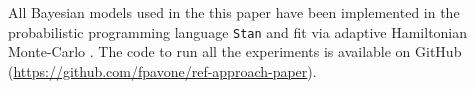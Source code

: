 \documentclass[american,]{article}
\theoremstyle{definition}
\begin{document}
All Bayesian models used in the this paper have been implemented in the probabilistic programming language \texttt{Stan} \citep{paper:stan} and fit via adaptive Hamiltonian Monte-Carlo \citep{hoffman2014no}. The code to run all the experiments is available on GitHub (\url{https://github.com/fpavone/ref-approach-paper}). 




 




\end{document}
